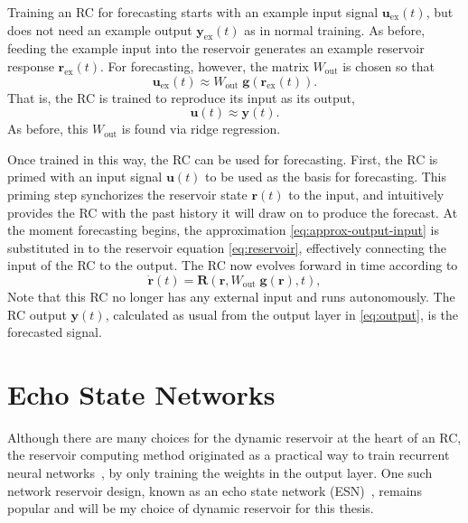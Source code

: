 Training an RC for forecasting starts with an example input signal
$\bm{u}_\text{ex}(t)$, but does not need an example output
$\bm{y}_\text{ex}(t)$ as in normal training. As before, feeding the
example input into the reservoir generates an example reservoir
response $\bm{r}_\text{ex}(t)$. For forecasting, however, the matrix
$W_\text{out}$ is chosen so that
\begin{equation}
  \label{eq:approx-output-forecast}
  \mathbf{u}_\text{ex}(t) \approx W_\text{out}\;\mathbf{g}\left(\mathbf{r}_\text{ex}(t)\right).
\end{equation}
That is, the RC is trained to reproduce its input as its output,
\begin{equation}
  \label{eq:approx-output-input}
  \bm{u}(t) \approx \bm{y}(t).
\end{equation}
As before, this $W_\text{out}$ is found via ridge regression.

Once trained in this way, the RC can be used for forecasting. First,
the RC is primed with an input signal $\bm{u}(t)$ to be used as the
basis for forecasting. This priming step synchorizes the reservoir
state $\bm{r}(t)$ to the input, and intuitively provides the RC with
the past history it will draw on to produce the forecast. At the
moment forecasting begins, the approximation
\cref{eq:approx-output-input} is substituted in to the reservoir
equation \cref{eq:reservoir}, effectively connecting the input of the
RC to the output. The RC now evolves forward in time according to
\begin{equation}
  \label{eq:reservoir-auto}
  \dot{\mathbf{r}}(t) = \mathbf{R}\left(\mathbf{r}, W_\text{out}\;\bm{g}(\bm{r}), t\right),
\end{equation}
Note that this RC no longer has any external input and runs
autonomously. The RC output $\bm{y}(t)$, calculated as usual from the
output layer in \cref{eq:output}, is the forecasted signal.

\section{Echo State Networks}\label{sec:esn}

Although there are many choices for the dynamic reservoir at the heart
of an RC, the reservoir computing method originated as a practical way
to train recurrent neural networks~\cite{lukosevicius2009}, by only
training the weights in the output layer. One such network reservoir
design, known as an echo state network (ESN)~\cite{jaeger2001},
remains popular and will be my choice of dynamic reservoir for this
thesis.


